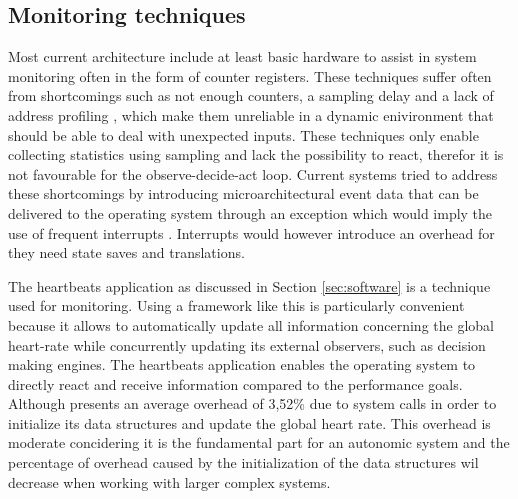 \subsection{Monitoring techniques}
\label{sec:selfawareness}
Most current architecture include at least basic hardware to assist in system monitoring often in the form of counter registers. These techniques suffer often from shortcomings such as not enough counters, a sampling delay and a lack of address profiling \cite{reconfigurable}, which make them unreliable in a dynamic enivironment that should be able to deal with unexpected inputs. These techniques only enable collecting statistics using sampling and lack the possibility to react, therefor it is not favourable for the observe-decide-act loop. Current systems tried to address these shortcomings by introducing microarchitectural event data that can be delivered to the operating system through an exception which would imply the use of frequent interrupts \cite{reconfigurable}. Interrupts would however introduce an overhead for they need state saves and translations. 

The heartbeats application as discussed in Section \ref{sec:software} is a technique used for monitoring. Using a framework like this is particularly convenient because it allows to automatically update all information concerning the global heart-rate while concurrently updating its external observers, such as decision making engines. The heartbeats application enables the operating system to directly react and receive information compared to the performance goals. Although \cite{selfaware} presents an average overhead of 3,52\% due to system calls in order to initialize its data structures and update the global heart rate. This overhead is moderate concidering it is the fundamental part for an autonomic system and the percentage of overhead caused by the initialization of the data structures wil decrease when working with larger complex systems. 